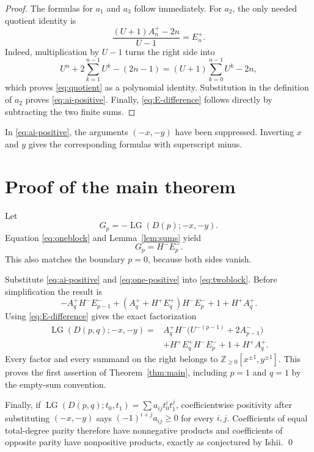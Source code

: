 \documentclass[11pt]{amsart}
\theoremstyle{remark}
\newcommand{\LG}{\operatorname{LG}}
\newcommand{\Z}{\mathbb Z}
\begin{document}
\begin{proof}
The formulas for $a_1$ and $a_3$ follow immediately.  For $a_2$, the only
needed quotient identity is
\begin{equation}
 \frac{(U+1)A_n^+-2n}{U-1}=E_n^+.
 \label{eq:quotient}
\end{equation}
Indeed, multiplication by $U-1$ turns the right side into
\[
 U^n+2\sum_{k=1}^{n-1}U^k-(2n-1)
 =(U+1)\sum_{k=0}^{n-1}U^k-2n,
\]
which proves \eqref{eq:quotient} as a polynomial identity.  Substitution in
the definition of $a_2$ proves \eqref{eq:ai-positive}.  Finally,
\eqref{eq:E-difference} follows directly by subtracting the two finite sums.
\end{proof}

In \eqref{eq:ai-positive}, the arguments $(-x,-y)$ have been suppressed.
Inverting $x$ and $y$ gives the corresponding formulas with superscript
minus.

\section{Proof of the main theorem}

Let
\[
 G_p=-\LG(D(p);-x,-y).
\]
Equation \eqref{eq:oneblock} and Lemma~\ref{lem:sums} yield
\begin{equation}
 G_p=H^-E_p^- .                            \label{eq:one-positive}
\end{equation}
This also matches the boundary $p=0$, because both sides vanish.

Substitute \eqref{eq:ai-positive} and \eqref{eq:one-positive} into
\eqref{eq:twoblock}.  Before simplification the result is
\[
 -A_q^+H^-E_{p-1}^-
 +(A_q^++H^+E_q^+)H^-E_p^-
 +1+H^+A_q^+.
\]
Using \eqref{eq:E-difference} gives the exact factorization
\begin{equation}
\boxed{\begin{aligned}
\LG(D(p,q);-x,-y)={}&
A_q^+H^-\bigl(U^{-(p-1)}+2A_{p-1}^-\bigr)\\
&+H^+E_q^+H^-E_p^-+1+H^+A_q^+.
\end{aligned}}                             \label{eq:factorization}
\end{equation}
Every factor and every summand on the right belongs to
$\Z_{\geq0}[x^{\pm1},y^{\pm1}]$.  This proves the first assertion of
Theorem~\ref{thm:main}, including $p=1$ and $q=1$ by the empty-sum
convention.

Finally, if
$\LG(D(p,q);t_0,t_1)=\sum a_{ij}t_0^it_1^j$, coefficientwise positivity
after substituting $(-x,-y)$ says $(-1)^{i+j}a_{ij}\geq0$ for every
$i,j$.  Coefficients of equal total-degree parity therefore have
nonnegative products and coefficients of opposite parity have nonpositive
products, exactly as conjectured by Ishii.  \qed
\end{document}
